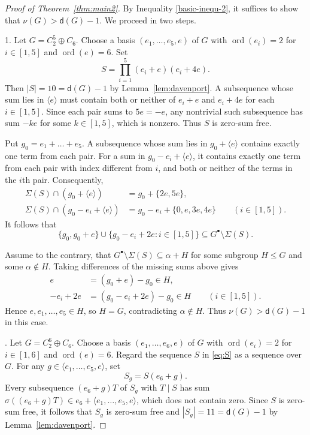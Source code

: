 \documentclass[10pt,a4paper]{amsart}
\newcommand{\dd}{\mathsf d}
\DeclareMathOperator{\ord}{ord}
\begin{document}
\begin{proof}[Proof of Theorem~\ref{thm:main2}]
By Inequality \eqref{basic-inequ-2},   it suffices to show that $\nu(G)>\dd(G)-1$. We proceed in two steps.

1. Let $G=C_2^5\oplus C_6$.
Choose a basis $(e_1,\ldots,e_5,e)$ of $G$ with
$\ord(e_i)=2$ for $i\in[1,5]$ and $\ord(e)=6$. Set
\begin{equation}\label{eq:S}
 S=\prod_{i=1}^5(e_i+e)(e_i+4e).
\end{equation}
Then $|S|=10=\dd(G)-1$ by Lemma~\ref{lem:davenport}. A subsequence whose sum lies in $\langle e\rangle$
must contain both or neither of $e_i+e$ and $e_i+4e$
for each $i\in[1,5]$. Since each pair sums to $5e=-e$,
any nontrivial such subsequence has sum $-ke$ for some
$k\in[1,5]$, which is nonzero. Thus $S$ is zero-sum free.

Put $g_0=e_1+\ldots+e_5$. A subsequence whose sum lies in
$g_0+\langle e\rangle$ contains exactly one term from each pair.
For a sum in $g_0-e_i+\langle e\rangle$, it contains exactly
one term from each pair with index different from $i$,
and both or neither of the terms in the $i$th pair.
Consequently,
\begin{align*}
 \Sigma(S)\cap(g_0+\langle e\rangle)
   &=g_0+\{2e,5e\},\\
 \Sigma(S)\cap(g_0-e_i+\langle e\rangle)
   &=g_0-e_i+\{0,e,3e,4e\}
   \qquad(i\in[1,5]).
\end{align*}
It follows that
$$
 \{g_0,g_0+e\}
 \cup\{g_0-e_i+2e:i\in[1,5]\}
 \subseteq G^\bullet\setminus\Sigma(S).
$$

Assume to the contrary, that
$G^\bullet\setminus\Sigma(S)\subseteq\alpha+H$
for some subgroup $H\le G$ and some $\alpha\notin H$.
Taking differences of the missing sums above gives
\begin{align*}
 e &= (g_0+e)-g_0\in H,\\
 -e_i+2e &= (g_0-e_i+2e)-g_0\in H
 \qquad(i\in[1,5]).
\end{align*}
Hence $e,e_1,\ldots,e_5\in H$, so $H=G$,
contradicting $\alpha\notin H$. Thus $\nu(G)>\dd(G)-1$ in this case.

. Let $G=C_2^6\oplus C_6$.
Choose a basis $(e_1,\ldots,e_6,e)$ of $G$ with
$\ord(e_i)=2$ for $i\in[1,6]$ and $\ord(e)=6$.
Regard the sequence $S$ in \eqref{eq:S} as a sequence over $G$.
For any $g\in\langle e_1,\ldots,e_5,e\rangle$, set
\begin{equation}\label{eq:lift}
	S_g=S(e_6+g).
\end{equation}
Every subsequence $(e_6+g)T$ of $S_g$ with $T\mid S$ has sum
$\sigma((e_6+g)T)\in e_6+\langle e_1,\ldots,e_5,e\rangle$, which does not contain zero.
Since $S$ is zero-sum free, it follows that $S_g$ is zero-sum free
and $|S_g|=11=\dd(G)-1$ by Lemma~\ref{lem:davenport}.


\end{proof}
\end{document}
